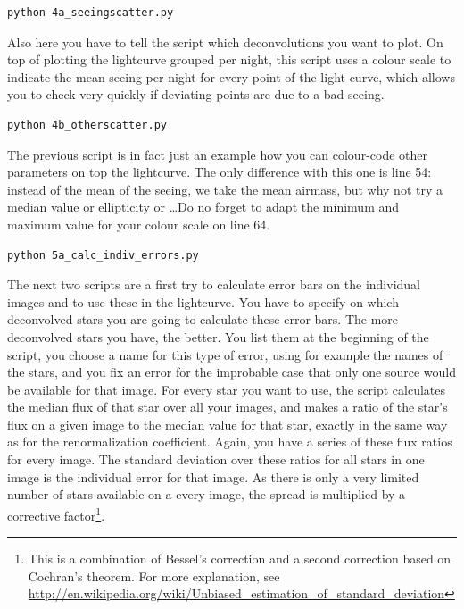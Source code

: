 \begin{Verbatim}
python 4a_seeingscatter.py
\end{Verbatim}

Also here you have to tell the script which deconvolutions you want to plot. On top of plotting the lightcurve grouped per night, this script uses a colour scale to indicate the mean seeing per night for every point of the light curve, which allows you to check very quickly if deviating points are due to a bad seeing.

\begin{Verbatim}
python 4b_otherscatter.py
\end{Verbatim}

The previous script is in fact just an example how you can colour-code other parameters on top the lightcurve. The only difference with this one is line 54: instead of the mean of the seeing, we take the mean airmass, but why not try a median value or ellipticity or \ldots Do no forget to adapt the minimum and maximum value for your colour scale on line 64.

\begin{Verbatim}
python 5a_calc_indiv_errors.py
\end{Verbatim}

The next two scripts are a first try to calculate error bars on the individual images and to use these in the lightcurve. You have to specify on which deconvolved stars you are going to calculate these error bars. The more deconvolved stars you have, the better. You list them at the beginning of the script, you choose a name for this type of error, using for example the names of the stars, and you fix an error for the improbable case that only one source would be available for that image. 
For every star you want to use, the script calculates the median flux of that star over all your images, and makes a ratio of the star's flux on a given image to the median value for that star, exactly in the same way as for the renormalization coefficient. Again, you have a series of these flux ratios for every image. The standard deviation over these ratios for all stars in one image is the individual error for that image. As there is only a very limited number of stars available on a every image, the spread is multiplied by a corrective factor\footnote{This is a combination of Bessel's correction and a second correction based on Cochran's theorem. For more explanation, see \url{http://en.wikipedia.org/wiki/Unbiased_estimation_of_standard_deviation}}. 

